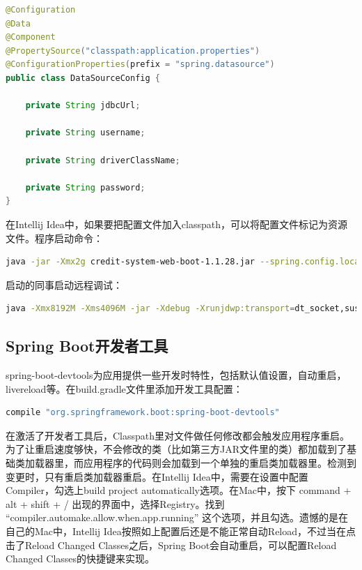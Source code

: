 \documentclass[letter]{book}
\begin{document}
\begin{lstlisting}[language=Java]
@Configuration
@Data
@Component
@PropertySource("classpath:application.properties")
@ConfigurationProperties(prefix = "spring.datasource")
public class DataSourceConfig {

	private String jdbcUrl;
	
	private String username;
	
	private String driverClassName;
	
	private String password;
}
\end{lstlisting}

在Intellij Idea中，如果要把配置文件加入classpath，可以将配置文件标记为资源文件。程序启动命令：

\begin{lstlisting}[language=Bash]
java -jar -Xmx2g credit-system-web-boot-1.1.28.jar --spring.config.location=application-jenkins.properties
\end{lstlisting}

启动的同事启动远程调试：

\begin{lstlisting}[language=Bash]
java -Xmx8192M -Xms4096M -jar -Xdebug -Xrunjdwp:transport=dt_socket,suspend=n,server=y,address=5005 /home/app/backend/credit-system-web-boot-1.1.28.jar --spring.config.location=application-jenkins.properties
\end{lstlisting}



\subsection{Spring Boot开发者工具}

spring-boot-devtools为应用提供一些开发时特性，包括默认值设置，自动重启，livereload等。在build.gradle文件里添加开发工具配置：

\begin{lstlisting}[language=Bash]
compile "org.springframework.boot:spring-boot-devtools"
\end{lstlisting}

在激活了开发者工具后，Classpath里对文件做任何修改都会触发应用程序重启。为了让重启速度够快，不会修改的类（比如第三方JAR文件里的类）都加载到了基础类加载器里，而应用程序的代码则会加载到一个单独的重启类加载器里。检测到变更时，只有重启类加载器重启。在Intellij Idea中，需要在设置中配置Compiler，勾选上build project automatically选项。在Mac中，按下 command + alt + shift + / 出现的界面中，选择Registry。找到 “compiler.automake.allow.when.app.running” 这个选项，并且勾选。遗憾的是在自己的Mac中，Intellij Idea按照如上配置后还是不能正常自动Reload，不过当在点击了Reload Changed Classes之后，Spring Boot会自动重启，可以配置Reload Changed Classes的快捷键来实现。
\end{document}
